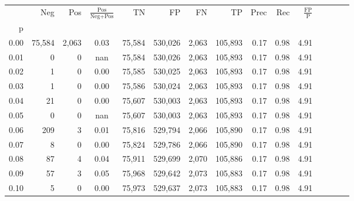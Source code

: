 \begin{tabular}{rrrcrrrrrrrrrrr}
\toprule
{} &     Neg &     Pos & $\frac{\text{Pos}}{\text{Neg}+\text{Pos}}$ &       TN &       FP &       FN &       TP &  Prec &   Rec & $\frac{\text{FP}}{\text{P}}$ \\
p    &         &         &                                            &          &          &          &          &       &       &                              \\
\midrule
0.00 &  75,584 &   2,063 &                                       0.03 &   75,584 &  530,026 &    2,063 &  105,893 &  0.17 &  0.98 &                         4.91 \\
0.01 &       0 &       0 &                                        nan &   75,584 &  530,026 &    2,063 &  105,893 &  0.17 &  0.98 &                         4.91 \\
0.02 &       1 &       0 &                                       0.00 &   75,585 &  530,025 &    2,063 &  105,893 &  0.17 &  0.98 &                         4.91 \\
0.03 &       1 &       0 &                                       0.00 &   75,586 &  530,024 &    2,063 &  105,893 &  0.17 &  0.98 &                         4.91 \\
0.04 &      21 &       0 &                                       0.00 &   75,607 &  530,003 &    2,063 &  105,893 &  0.17 &  0.98 &                         4.91 \\
0.05 &       0 &       0 &                                        nan &   75,607 &  530,003 &    2,063 &  105,893 &  0.17 &  0.98 &                         4.91 \\
0.06 &     209 &       3 &                                       0.01 &   75,816 &  529,794 &    2,066 &  105,890 &  0.17 &  0.98 &                         4.91 \\
0.07 &       8 &       0 &                                       0.00 &   75,824 &  529,786 &    2,066 &  105,890 &  0.17 &  0.98 &                         4.91 \\
0.08 &      87 &       4 &                                       0.04 &   75,911 &  529,699 &    2,070 &  105,886 &  0.17 &  0.98 &                         4.91 \\
0.09 &      57 &       3 &                                       0.05 &   75,968 &  529,642 &    2,073 &  105,883 &  0.17 &  0.98 &                         4.91 \\
0.10 &       5 &       0 &                                       0.00 &   75,973 &  529,637 &    2,073 &  105,883 &  0.17 &  0.98 &                         4.91 \\

\end{tabular}
